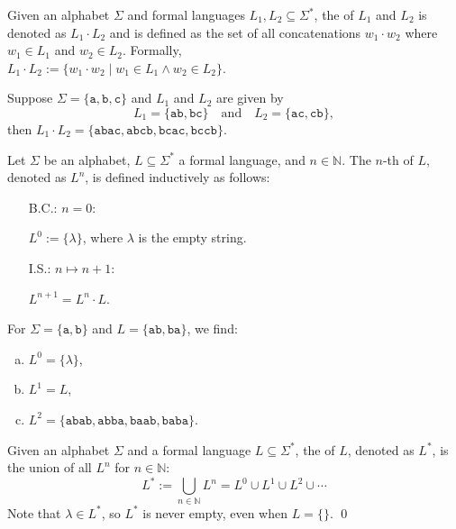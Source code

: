 \begin{Definition}
  Given an alphabet \( \Sigma \) and formal languages \( L_1, L_2 \subseteq \Sigma^* \), the  of \( L_1 \) and \( L_2 \) is denoted as \( L_1 \cdot L_2 \) and is defined as the set of all concatenations \( w_1 \cdot w_2 \) where \( w_1 \in L_1 \) and \( w_2 \in L_2 \). Formally, 
\\[0.2cm]
\hspace*{1.3cm}
$ L_1 \cdot L_2 := \{ w_1 \cdot w_2 \mid w_1 \in L_1 \land w_2 \in L_2 \}$. \eox 
\end{Definition}

\exampleEng
Suppose \( \Sigma = \{ \texttt{a}, \texttt{b}, \texttt{c} \} \) and \( L_1 \) and \( L_2 \) are given by
\[
L_1 = \{ \texttt{ab}, \texttt{bc} \} \quad \text{and} \quad L_2 = \{ \texttt{ac}, \texttt{cb} \},
\]
then \( L_1 \cdot L_2 = \{ \texttt{abac}, \texttt{abcb}, \texttt{bcac}, \texttt{bccb} \} \). \eox
\pagebreak

\begin{Definition}
Let \( \Sigma \) be an alphabet, \( L \subseteq \Sigma^* \) a formal language, and \( n \in \mathbb{N} \). The \( n \)-th  of \( L \), denoted as \( L^n \), is defined inductively as follows:
\begin{enumerate}
\item[B.C.:] \( n = 0 \):

             \( L^0 := \{ \lambda \} \), \quad where \( \lambda \) is the empty string.
\item[I.S.:] \( n \mapsto n + 1 \):
             
             \( L^{n+1} = L^n \cdot L \). \eox
\end{enumerate}
\end{Definition}

\exampleEng
For \( \Sigma = \{ \texttt{a}, \texttt{b} \} \) and \( L = \{ \texttt{ab}, \texttt{ba} \} \), we find:
\begin{enumerate}[(a)]
\item \( L^0 = \{ \lambda \} \),
\item \( L^1 = L \),
\item \( L^2 = \{ \texttt{abab}, \texttt{abba}, \texttt{baab}, \texttt{baba} \} \). \eox
\end{enumerate}

\begin{Definition}
  Given an alphabet \( \Sigma \) and a formal language \( L \subseteq \Sigma^* \), the  of \( L \), denoted as \( L^* \), is the union of all \( L^n \) for \( n \in \mathbb{N} \):
  \[
  L^* := \bigcup_{n \in \mathbb{N}} L^n = L^0 \cup L^1 \cup L^2 \cup \cdots
  \]
  Note that \( \lambda \in L^* \), so \( L^* \) is never empty, even when \( L = \{\} \). \qed
\end{Definition}


